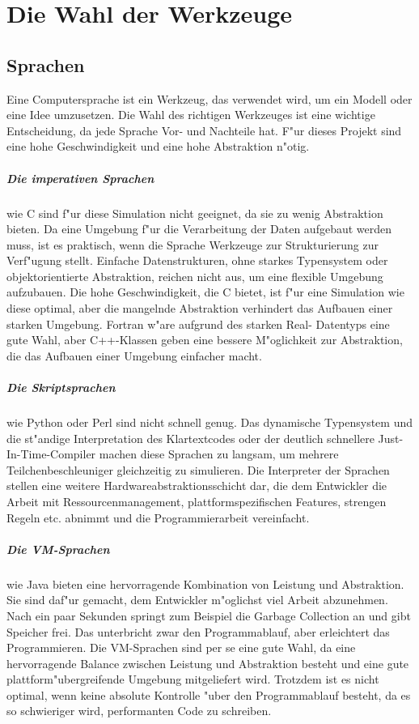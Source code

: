\documentclass[14pt, a4paper]{report}
\begin{document}
\chapter{Die Wahl der Werkzeuge}
\section{Sprachen}
Eine Computersprache ist ein Werkzeug, das verwendet wird, um ein Modell oder eine Idee
umzusetzen. Die Wahl des richtigen Werkzeuges ist eine wichtige Entscheidung, da jede
Sprache Vor- und Nachteile hat. F"ur dieses Projekt sind eine hohe Geschwindigkeit 
und eine hohe Abstraktion n"otig.

\paragraph{Die imperativen Sprachen} wie C sind f"ur diese Simulation
nicht geeignet, da sie zu wenig Abstraktion bieten. Da eine Umgebung f"ur die 
Verarbeitung der Daten aufgebaut werden 
muss, ist es praktisch, wenn die Sprache Werkzeuge zur Strukturierung zur Verf"ugung 
stellt. Einfache Datenstrukturen, ohne starkes Typensystem oder 
objektorientierte Abstraktion,
reichen nicht aus, um eine flexible Umgebung aufzubauen. Die hohe Geschwindigkeit, die
C bietet, ist f"ur eine Simulation wie diese optimal, aber die mangelnde Abstraktion
verhindert das Aufbauen einer starken Umgebung. Fortran w"are aufgrund des starken Real-
Datentyps eine gute Wahl, aber C++-Klassen geben eine bessere M"oglichkeit zur 
Abstraktion, die das Aufbauen einer Umgebung einfacher macht.

\paragraph{Die Skriptsprachen} wie Python oder Perl sind nicht schnell genug.
Das dynamische Typensystem und die st"andige Interpretation des Klartextcodes oder 
der deutlich schnellere Just-In-Time-Compiler machen 
diese Sprachen zu langsam, um mehrere Teilchenbeschleuniger gleichzeitig zu 
simulieren. Die Interpreter der Sprachen stellen eine weitere Hardwareabstraktionsschicht
dar, die dem Entwickler die Arbeit mit Ressourcenmanagement, plattformspezifischen Features,
strengen Regeln etc. abnimmt und die Programmierarbeit vereinfacht.

\paragraph{Die VM-Sprachen} wie Java bieten eine hervorragende Kombination von 
Leistung und Abstraktion. Sie sind daf"ur gemacht, dem Entwickler m"oglichst viel Arbeit
abzunehmen. Nach ein paar Sekunden springt zum Beispiel die Garbage Collection an und
gibt Speicher frei. Das unterbricht zwar den Programmablauf, aber erleichtert das Programmieren. 
Die VM-Sprachen sind per se eine gute Wahl, da eine hervorragende Balance zwischen Leistung und Abstraktion 
besteht und eine gute plattform"ubergreifende Umgebung mitgeliefert wird. 
Trotzdem ist es nicht optimal, wenn keine absolute  Kontrolle "uber den Programmablauf besteht, da es so
schwieriger wird, performanten Code zu schreiben.
\end{document}
